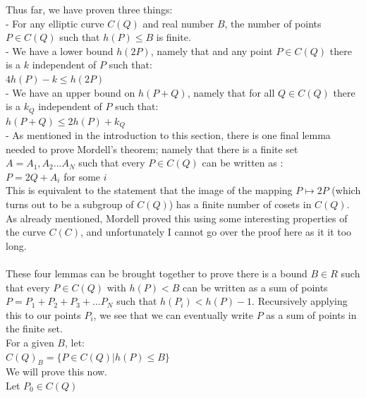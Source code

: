 \documentclass{article}
\begin{document}
Thus far, we have proven three things:\\

- For any elliptic curve $C(Q)$ and  real number $B$, the number of points $P \in C(Q)$ such that $h(P) \leq B$ is finite.\\

- We have a lower bound $h(2P)$, namely that and any point $P \in C(Q)$ there is a $k$ independent of $P$ such that:\\

$4h(P) - k \leq h(2P) $\\

- We have an upper bound on $h(P + Q)$, namely that for all $Q \in C(Q)$ there is a $k_Q$ independent of $P$ such that:\\

$h(P + Q) \leq 2h(P) + k_Q$\\

- As mentioned in the introduction to this section, there is one final lemma needed to prove Mordell's theorem; namely that there is a finite set $A = {A_1, A_2 ... A_N}$ such that every $P \in C(Q)$ can be written as :\\

$P = 2Q + A_i$ for some $i$\\

This is equivalent to the statement that the image of the mapping $P \mapsto 2P$ (which turns out to be a subgroup of $C(Q)$) has a finite number of cosets in $C(Q)$. As already mentioned, Mordell proved this using some interesting properties of the curve $C(C)$, and unfortunately I cannot go over the proof here as it it too long.\\
 \\
These four lemmas can be brought together to prove there is a bound $B \in R$ such that every $P \in C(Q)$ with $h(P) < B$ can be written as a sum of points $P = P_1 + P_2 + P_3 + \dots P_N$ such that $h(P_i) < h(P) - 1$. Recursively applying this to our points $P_i$, we see that we can eventually write $P$ as a sum of points in the finite set.\\

For a given $B$, let:\\

$C(Q)_B = \{P \in C(Q) | h(P) \leq B\}$\\

We will prove this now.\\

Let $P_0 \in C(Q)$\\
\end{document}
